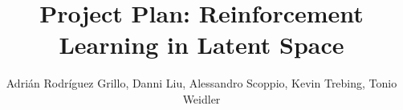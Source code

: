 \documentclass[11pt]{article}
\title{Project Plan: Reinforcement Learning in Latent Space}
\author{Adrián Rodríguez Grillo, Danni Liu, Alessandro Scoppio, Kevin Trebing, Tonio Weidler}
\begin{document}
\maketitle







{\tiny\printbibliography}

\clearpage
\raggedbottom
\appendix
\begin{appendix}
\end{appendix}
\end{document}
